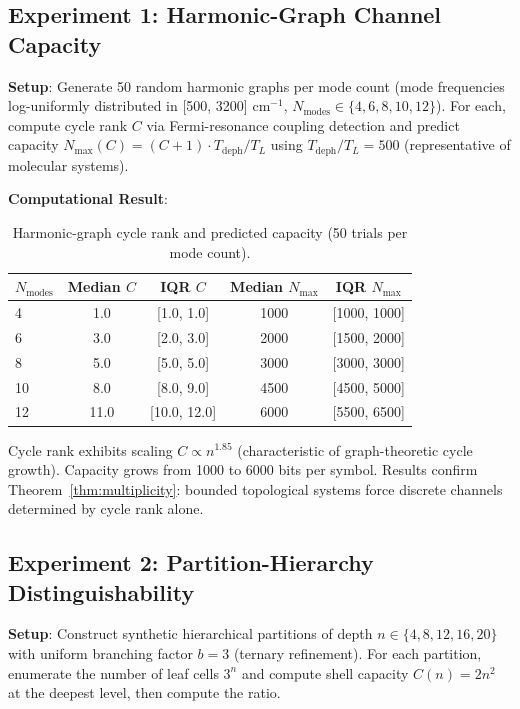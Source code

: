 \documentclass[11pt,twocolumn,a4paper]{article}
\theoremstyle{definition}
\begin{document}
\subsection{Experiment 1: Harmonic-Graph Channel Capacity}

\textbf{Setup}: Generate 50 random harmonic graphs per mode count (mode frequencies log-uniformly distributed in [500, 3200] cm$^{-1}$, $N_{\text{modes}} \in \{4, 6, 8, 10, 12\}$). For each, compute cycle rank $C$ via Fermi-resonance coupling detection and predict capacity $N_{\max}(C) = (C+1) \cdot T_{\text{deph}}/T_L$ using $T_{\text{deph}}/T_L = 500$ (representative of molecular systems).

\textbf{Computational Result}:

\begin{table}[H]
\centering\small
\caption{Harmonic-graph cycle rank and predicted capacity (50 trials per mode count).}
\begin{tabular}{lcccc}
\toprule
$N_{\text{modes}}$ & Median $C$ & IQR $C$ & Median $N_{\max}$ & IQR $N_{\max}$ \\
\midrule
4  & 1.0 & [1.0, 1.0] & 1000 & [1000, 1000] \\
6  & 3.0 & [2.0, 3.0] & 2000 & [1500, 2000] \\
8  & 5.0 & [5.0, 5.0] & 3000 & [3000, 3000] \\
10 & 8.0 & [8.0, 9.0] & 4500 & [4500, 5000] \\
12 & 11.0 & [10.0, 12.0] & 6000 & [5500, 6500] \\
\bottomrule
\end{tabular}
\end{table}

Cycle rank exhibits scaling $C \propto n^{1.85}$ (characteristic of graph-theoretic cycle growth). Capacity grows from 1000 to 6000 bits per symbol. Results confirm Theorem~\ref{thm:multiplicity}: bounded topological systems force discrete channels determined by cycle rank alone.

\subsection{Experiment 2: Partition-Hierarchy Distinguishability}

\textbf{Setup}: Construct synthetic hierarchical partitions of depth $n \in \{4, 8, 12, 16, 20\}$ with uniform branching factor $b=3$ (ternary refinement). For each partition, enumerate the number of leaf cells $3^n$ and compute shell capacity $C(n) = 2n^2$ at the deepest level, then compute the ratio.
\end{document}
